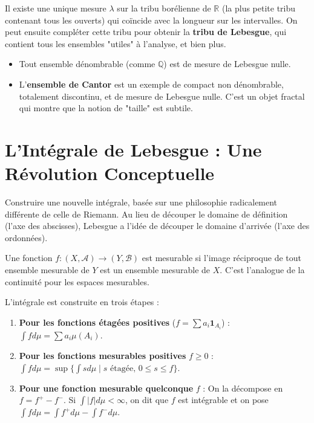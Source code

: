 \begin{theorem}
    Il existe une unique mesure $\lambda$ sur la tribu borélienne de $\mathbb{R}$ (la plus petite tribu contenant tous les ouverts) qui coïncide avec la longueur sur les intervalles. On peut ensuite compléter cette tribu pour obtenir la \textbf{tribu de Lebesgue}, qui contient tous les ensembles "utiles" à l'analyse, et bien plus.
\end{theorem}

\begin{example}
    \begin{itemize}
        \item Tout ensemble dénombrable (comme $\mathbb{Q}$) est de mesure de Lebesgue nulle.
        \item L'\textbf{ensemble de Cantor} est un exemple de compact non dénombrable, totalement discontinu, et de mesure de Lebesgue nulle. C'est un objet fractal qui montre que la notion de "taille" est subtile.
    \end{itemize}
\end{example}

\section{L'Intégrale de Lebesgue : Une Révolution Conceptuelle}

\begin{objectif}
    Construire une nouvelle intégrale, basée sur une philosophie radicalement différente de celle de Riemann. Au lieu de découper le domaine de définition (l'axe des abscisses), Lebesgue a l'idée de découper le domaine d'arrivée (l'axe des ordonnées).
\end{objectif}

\begin{definition}
    Une fonction $f: (X, \mathcal{A}) \to (Y, \mathcal{B})$ est mesurable si l'image réciproque de tout ensemble mesurable de $Y$ est un ensemble mesurable de $X$. C'est l'analogue de la continuité pour les espaces mesurables.
\end{definition}

\begin{proposition}
    L'intégrale est construite en trois étapes :
    \begin{enumerate}
        \item \textbf{Pour les fonctions étagées positives} ($f = \sum a_i \mathbf{1}_{A_i}$) : $\int f d\mu = \sum a_i \mu(A_i)$.
        \item \textbf{Pour les fonctions mesurables positives} $f \ge 0$ : $\int f d\mu = \sup \{ \int s d\mu \mid s \text{ étagée, } 0 \le s \le f \}$.
        \item \textbf{Pour une fonction mesurable quelconque} $f$ : On la décompose en $f=f^+ - f^-$. Si $\int |f| d\mu < \infty$, on dit que $f$ est intégrable et on pose $\int f d\mu = \int f^+ d\mu - \int f^- d\mu$.
    \end{enumerate}
\end{proposition}

